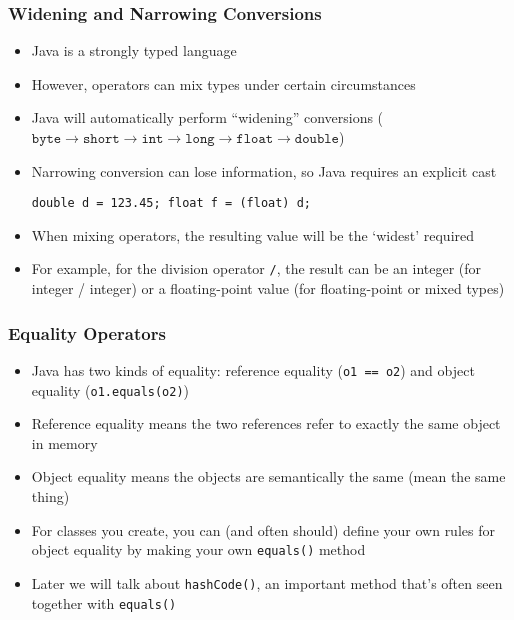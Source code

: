 \documentclass{beamer}
\begin{document}
\begin{frame}[fragile]
\frametitle{Widening and Narrowing Conversions}
\begin{itemize}
\item Java is a strongly typed language
\item However, operators can mix types under certain circumstances
\item Java will automatically perform ``widening'' conversions ($\texttt{byte} \rightarrow \texttt{short} \rightarrow \texttt{int} \rightarrow \texttt{long} \rightarrow \texttt{float} \rightarrow \texttt{double}$)
\item Narrowing conversion can lose information, so Java requires an explicit cast
\lstset{language=Java}
\begin{lstlisting}
double d = 123.45; float f = (float) d;
\end{lstlisting}
\item When mixing operators, the resulting value will be the `widest' required
\item For example, for the division operator \texttt{/}, the result can be an integer (for integer / integer) or a floating-point value (for floating-point or mixed types)
\end{itemize}
\end{frame}

\begin{frame}
\frametitle{Equality Operators}
\begin{itemize}
\item Java has two kinds of equality: reference equality (\texttt{o1 == o2}) and object equality (\texttt{o1.equals(o2)})
\item Reference equality means the two references refer to exactly the same object in memory
\item Object equality means the objects are semantically the same (mean the same thing)
\item For classes you create, you can (and often should) define your own rules for object equality by making your own \texttt{equals()} method
\item Later we will talk about \texttt{hashCode()}, an important method that's often seen together with \texttt{equals()}
\end{itemize}
\end{frame}
\end{document}
